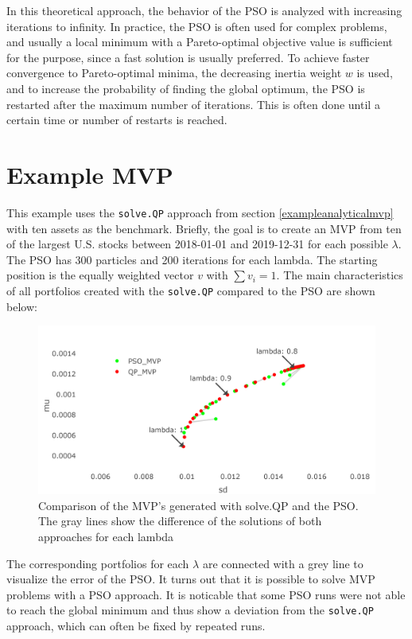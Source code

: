 \documentclass[
  oneside, a4paper, 12pt, openany]{book}
\theoremstyle{definition}
\theoremstyle{definition}
\theoremstyle{definition}
\theoremstyle{definition}
\theoremstyle{remark}
\begin{document}
In this theoretical approach, the behavior of the PSO is analyzed with increasing iterations to infinity. In practice, the PSO is often used for complex problems, and usually a local minimum with a Pareto-optimal objective value is sufficient for the purpose, since a fast solution is usually preferred. To achieve faster convergence to Pareto-optimal minima, the decreasing inertia weight \(w\) is used, and to increase the probability of finding the global optimum, the PSO is restarted after the maximum number of iterations. This is often done until a certain time or number of restarts is reached.

\hypertarget{example-mvp-1}{%
\section{Example MVP}\label{example-mvp-1}}

This example uses the \texttt{solve.QP} approach from section \ref{exampleanalyticalmvp} with ten assets as the benchmark. Briefly, the goal is to create an MVP from ten of the largest U.S. stocks between 2018-01-01 and 2019-12-31 for each possible \(\lambda\). The PSO has 300 particles and 200 iterations for each lambda. The starting position is the equally weighted vector \(v\) with \(\textstyle\sum v_i=1\). The main characteristics of all portfolios created with the \texttt{solve.QP} compared to the PSO are shown below:

\begin{figure}[H]
\includegraphics{Master_Thesis_files/figure-latex/pso7-1} \caption{Comparison of the MVP's generated with solve.QP and the PSO. The gray lines show the difference of the solutions of both approaches for each lambda}\label{fig:pso7}
\end{figure}

The corresponding portfolios for each \(\lambda\) are connected with a grey line to visualize the error of the PSO. It turns out that it is possible to solve MVP problems with a PSO approach. It is noticable that some PSO runs were not able to reach the global minimum and thus show a deviation from the \texttt{solve.QP} approach, which can often be fixed by repeated runs.
\end{document}
